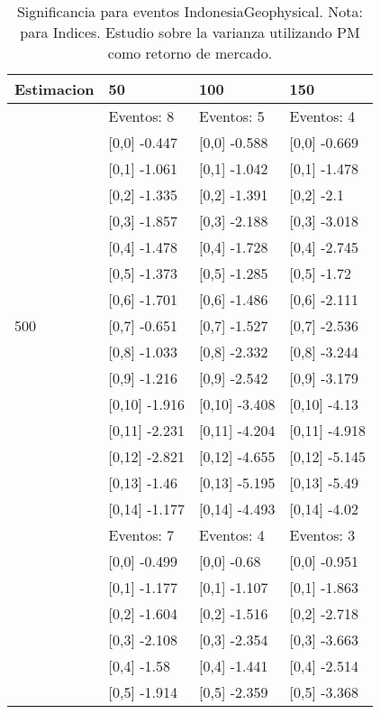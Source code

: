 \begin{table}

\caption{Significancia para eventos IndonesiaGeophysical. Nota: para Indices. Estudio sobre la varianza utilizando PM como retorno de mercado.}
\centering
\begin{tabular}[t]{llll}
\toprule
Estimacion & 50 & 100 & 150\\
\midrule
 & Eventos:  8 & Eventos:  5 & Eventos:  4\\
 & {}[0,0] -0.447 & {}[0,0] -0.588 & {}[0,0] -0.669\\
 & {}[0,1] -1.061 & {}[0,1] -1.042 & {}[0,1] -1.478\\
 & {}[0,2] -1.335 & {}[0,2] -1.391 & {}[0,2] -2.1\\
 & {}[0,3] -1.857 & {}[0,3] -2.188 & {}[0,3] -3.018\\
\addlinespace
 & {}[0,4] -1.478 & {}[0,4] -1.728 & {}[0,4] -2.745\\
 & {}[0,5] -1.373 & {}[0,5] -1.285 & {}[0,5] -1.72\\
 & {}[0,6] -1.701 & {}[0,6] -1.486 & {}[0,6] -2.111\\
500 & {}[0,7] -0.651 & {}[0,7] -1.527 & {}[0,7] -2.536\\
 & {}[0,8] -1.033 & {}[0,8] -2.332 & {}[0,8] -3.244\\
\addlinespace
 & {}[0,9] -1.216 & {}[0,9] -2.542 & {}[0,9] -3.179\\
 & {}[0,10] -1.916 & {}[0,10] -3.408 & {}[0,10] -4.13\\
 & {}[0,11] -2.231 & {}[0,11] -4.204 & {}[0,11] -4.918\\
 & {}[0,12] -2.821 & {}[0,12] -4.655 & {}[0,12] -5.145\\
 & {}[0,13] -1.46 & {}[0,13] -5.195 & {}[0,13] -5.49\\
\addlinespace
 & {}[0,14] -1.177 & {}[0,14] -4.493 & {}[0,14] -4.02\\
 & Eventos:  7 & Eventos:  4 & Eventos:  3\\
 & {}[0,0] -0.499 & {}[0,0] -0.68 & {}[0,0] -0.951\\
 & {}[0,1] -1.177 & {}[0,1] -1.107 & {}[0,1] -1.863\\
 & {}[0,2] -1.604 & {}[0,2] -1.516 & {}[0,2] -2.718\\
\addlinespace
 & {}[0,3] -2.108 & {}[0,3] -2.354 & {}[0,3] -3.663\\
 & {}[0,4] -1.58 & {}[0,4] -1.441 & {}[0,4] -2.514\\
 & {}[0,5] -1.914 & {}[0,5] -2.359 & {}[0,5] -3.368\\

\end{tabular}
\end{table}
